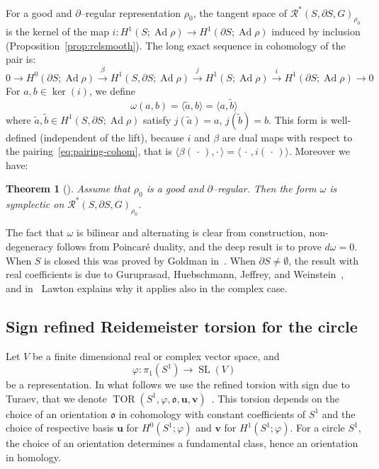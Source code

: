 \documentclass[11pt]{article}
\newtheorem{theo}{Theorem}[section]
\theoremstyle{definition}
\numberwithin{equation}{section}
\numberwithin{figure}{section}
\numberwithin{table}{section}
\DeclareMathOperator{\SL}{SL}
\DeclareMathOperator{\TOR}{TOR}
\DeclareMathOperator{\Ad}{Ad}
\newcommand{\Rcal}{\mathcal{R}}
\newcommand{\ofrk}{\mathfrak{o}}
\newcommand{\ubf}{\mathbf{u}}
\newcommand{\vbf}{\mathbf{v}}
\newcommand*\Rg{\Rcal^*}
\begin{document}
For a good and $\partial$--regular representation $\rho_0$, the tangent space of $\Rg(S,\partial S,G)_{\rho_0}$ is the kernel of the map $i\colon H^1(S;\Ad\rho) \to H^1(\partial S;\Ad\rho)$ induced by inclusion (Proposition~\ref{prop:relsmooth}). The long exact sequence in cohomology of the pair is:
\begin{equation*}
0\to {H^0(\partial S;\Ad\rho)}\overset\beta\to {H^1(S,\partial S;\Ad\rho)}
\overset j\to {H^1(S;\Ad\rho)}\overset i\to {H^1(\partial S;\Ad\rho)}
\to 0
\end{equation*}
For $a,b\in \ker(i)$, we define
\begin{equation}\label{eqn:omega}
\omega(a,b)= \langle \widetilde a,b \rangle = \langle a, \widetilde b \rangle
\end{equation}
where $\widetilde a, \widetilde b\in H^1(S,\partial S;\Ad\rho) $ satisfy $j(\widetilde a)=a$, $j(\widetilde b)=b$. This form is well-defined (independent of the lift), because $i$ and $\beta$ are dual maps with respect to the pairing~\eqref{eq:pairing-cohom}, that is $\langle \beta({\,\cdot\,}),\cdot\,\rangle= \langle \,\cdot\,, i({\,\cdot\,})\rangle$. Moreover we have:


\begin{theo}[\cite{GoldmanAdvances,GHJW,LawtonP}]
Assume that $\rho_0$ is a good and $\partial$--regular. Then the form $\omega$ is symplectic on $\Rg(S,\partial S,G)_{\rho_0}$.
\end{theo}

The fact that $\omega$ is bilinear and alternating is clear from construction, non-degen\-eracy follows from Poincaré duality, and the deep result is to prove $d\omega=0$. When $S$ is closed this was proved by Goldman in~\cite{GoldmanAdvances}. When $\partial S\neq\emptyset$, the result with real coefficients is due to Guruprasad, Huebschmann, Jeffrey, and Weinstein~\cite{GHJW}, and in~\cite{LawtonP} Lawton explains why it applies also in the complex case.



\subsection{Sign refined Reidemeister torsion for the circle}\label{sec:sgn_ref_tor}

Let $V$ be a finite dimensional real or complex vector space, and
\[
\varphi\colon\pi_1(S^1)\to \SL(V)
\]
be a representation. In what follows we use the refined torsion with sign due to Turaev, that we denote $\TOR(S^1,\varphi,\ofrk,\ubf,\vbf)$~\cite[Section~3]{TuraevKnotTheory}. This torsion depends on the choice of an orientation $\ofrk$ in cohomology with constant coefficients of $S^1$ and the choice of respective basis $\ubf$ for $H^0(S^1;\varphi)$ and $\vbf$ for $H^1(S^1;\varphi)$. For a circle $S^1$, the choice of an orientation determines a fundamental class, hence an orientation in homology.
\end{document}
